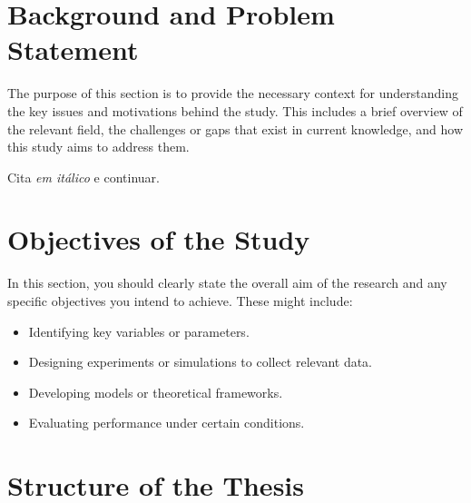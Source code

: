 


\section{Background and Problem Statement}
\label{sec:Background}
The purpose of this section is to provide the necessary context for understanding the key issues and motivations behind the study. This includes a brief overview of the relevant field, the challenges or gaps that exist in current knowledge, and how this study aims to address them.

Cita \textit{em itálico} e continuar.







\section{Objectives of the Study}
\label{sec:Objectives}
In this section, you should clearly state the overall aim of the research and any specific objectives you intend to achieve. These might include:
\begin{itemize}
    \item Identifying key variables or parameters.
    \item Designing experiments or simulations to collect relevant data.
    \item Developing models or theoretical frameworks.
    \item Evaluating performance under certain conditions.
\end{itemize}

\section{Structure of the Thesis}
\label{sec:Structure}  

